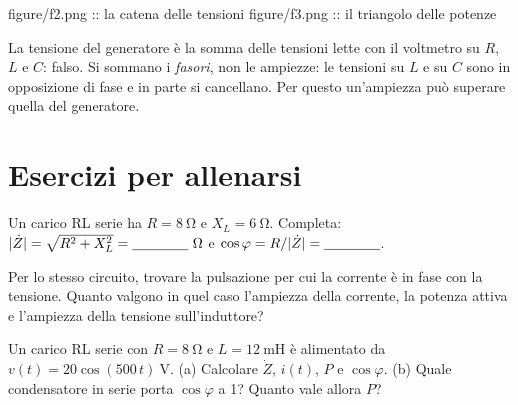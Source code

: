 \documentclass[10pt]{article}
\begin{document}
  {figure/f2.png :: la catena delle tensioni}
  {figure/f3.png :: il triangolo delle potenze}

\begin{preconcetto}
\guillemotleft La tensione del generatore è la somma delle tensioni lette con il voltmetro su $R$, $L$ e $C$\guillemotright: falso.
Si sommano i \emph{fasori}, non le ampiezze: le tensioni su $L$ e su $C$ sono in opposizione di fase e in parte si
cancellano. Per questo un'ampiezza può superare quella del generatore.
\end{preconcetto}

\section{Esercizi per allenarsi}

\begin{esercizio}[da completare]
Un carico RL serie ha $R = \qty{8}{\ohm}$ e $X_L = \qty{6}{\ohm}$. Completa: $\abs{\dot Z} = \sqrt{R^2 + X_L^2} = \vuoto\ \unit{\ohm}$
e $\cos\varphi = R/\lvert\dot Z\rvert = \underline{\hspace{4em}}$.
\end{esercizio}

\begin{esercizio}[risonanza]
Per lo stesso circuito, trovare la pulsazione per cui la corrente è in fase con la tensione. Quanto valgono
in quel caso l'ampiezza della corrente, la potenza attiva e l'ampiezza della tensione sull'induttore?
\end{esercizio}

\begin{esercizio}[rifasamento]
Un carico RL serie con $R = \qty{8}{\ohm}$ e $L = \qty{12}{\milli\henry}$ è alimentato da $v(t) = 20\cos(500\,t)\ \unit{\volt}$.
(a) Calcolare $\dot Z$, $i(t)$, $P$ e $\cos\varphi$. (b) Quale condensatore in serie porta $\cos\varphi$ a 1? Quanto vale allora $P$?
\end{esercizio}
\end{document}
